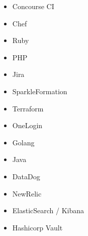 \documentclass[10pt,letterpaper]{article}
\begin{document}
{{{\begin{multicols}{3}
\begin{itemize}[left=0pt, labelsep=0.5em, itemindent=0pt, listparindent=\parindent, nosep]
          \item Concourse CI
          \item Chef
          \item Ruby
          \item PHP
          \item Jira
          \item SparkleFormation
          \item Terraform
          \item OneLogin
          \item Golang
          \item Java
          \item DataDog
          \item NewRelic
          \item ElasticSearch / Kibana
          \item Hashicorp Vault
        \end{itemize}
      \end{multicols}
    }
  }
}
\end{document}
